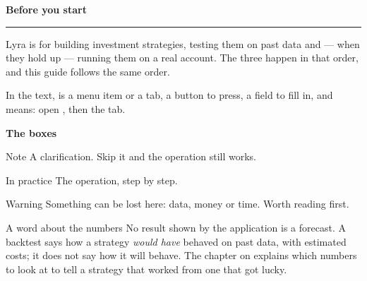 \cleardoublepage

\thispagestyle{empty}
\vspace*{18mm}

{\sffamily\Large\bfseries\color{lyraInchiostro}Before you start\par}
\vspace{3mm}
{\noindent\color{lyraAccento}\rule{\textwidth}{1pt}\par}
\vspace{7mm}

\noindent
Lyra is for building investment strategies, testing them on past data and
--- when they hold up --- running them on a real account. The three happen
in that order, and this guide follows the same order.

\vspace{4mm}
\noindent
In the text,  is a menu item or a tab,  a button to
press,  a field to fill in, and 
means: open , then the  tab.

\vspace{6mm}
{\sffamily\large\bfseries\color{lyraInchiostro}The boxes\par}
\vspace{3mm}

\begin{nota}{Note}
A clarification. Skip it and the operation still works.
\end{nota}

\begin{pratica}{In practice}
The operation, step by step.
\end{pratica}

\begin{attenzione}{Warning}
Something can be lost here: data, money or time. Worth reading first.
\end{attenzione}

\vspace{6mm}
\begin{perche}{A word about the numbers}
No result shown by the application is a forecast. A backtest says how a
strategy \emph{would have} behaved on past data, with estimated costs; it
does not say how it will behave. The chapter on  explains which
numbers to look at to tell a strategy that worked from one that got lucky.
\end{perche}

\cleardoublepage

